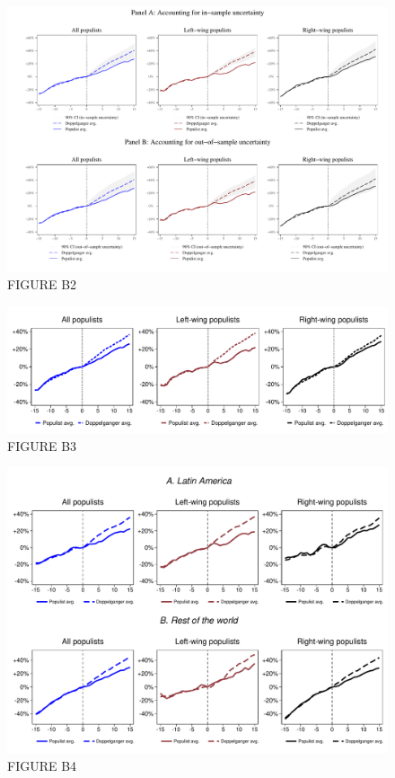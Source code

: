 \documentclass{article}
\begin{document}
\begin{figure}	
	\caption{FIGURE B2} 
		\includegraphics[scale=0.6]{FigureB2}\centering	
\end{figure}

\clearpage

\begin{figure}	
	\caption{FIGURE B3} 
		\includegraphics[scale=0.5]{FigureB3}\centering	
\end{figure}

\clearpage

\begin{figure}	
	\caption{FIGURE B4} 
		\includegraphics[scale=0.5]{FigureB4}\centering	
\end{figure}
\end{document}
